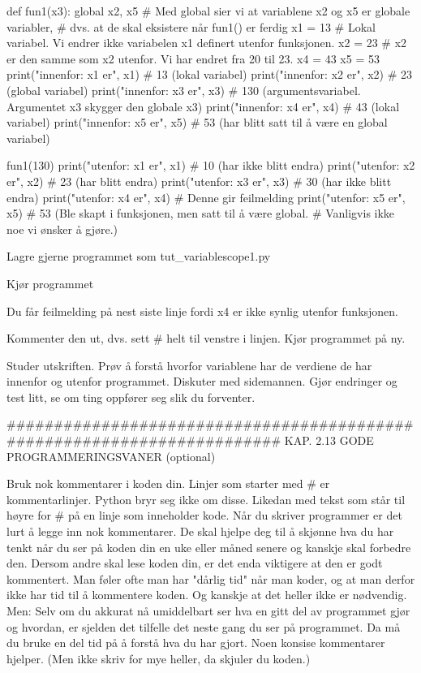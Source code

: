 {def fun1(x3):
    global x2, x5   # Med global sier vi at variablene x2 og x5 er globale variabler,  
                    # dvs. at de skal eksistere når fun1() er ferdig
    x1 = 13   # Lokal variabel. Vi endrer ikke variabelen x1 definert utenfor funksjonen. 
    x2 = 23   # x2 er den samme som x2 utenfor. Vi har endret fra 20 til 23. 
    x4 = 43
    x5 = 53
    print("innenfor: x1 er", x1)  #  13 (lokal variabel)
    print("innenfor: x2 er", x2)  #  23 (global variabel)
    print("innenfor: x3 er", x3)  # 130 (argumentsvariabel. Argumentet x3 skygger den globale x3)
    print("innenfor: x4 er", x4)  #  43 (lokal variabel)
    print("innenfor: x5 er", x5)  #  53 (har blitt satt til å være en global variabel)

fun1(130)
print("utenfor: x1 er", x1)   # 10 (har ikke blitt endra)
print("utenfor: x2 er", x2)   # 23 (har blitt endra)
print("utenfor: x3 er", x3)   # 30 (har ikke blitt endra)
print("utenfor: x4 er", x4)   # Denne gir feilmelding 
print("utenfor: x5 er", x5)   # 53 (Ble skapt i funksjonen, men satt til å være global. 
                              # Vanligvis ikke noe vi ønsker å gjøre.) 

Lagre gjerne programmet som tut_variablescope1.py

Kjør programmet

Du får feilmelding på nest siste linje fordi x4 er ikke synlig utenfor funksjonen. 

Kommenter den ut, dvs. sett # helt til venstre i linjen. 
Kjør programmet på ny.

Studer utskriften.
Prøv å forstå hvorfor variablene har de verdiene de har innenfor og utenfor programmet.
Diskuter med sidemannen. 
Gjør endringer og test litt, se om ting oppfører seg slik du forventer. 

######################################################################## 
KAP. 2.13  GODE PROGRAMMERINGSVANER  (optional)

Bruk nok kommentarer i koden din. 
Linjer som starter med # er kommentarlinjer. 
Python bryr seg ikke om disse. 
Likedan med tekst som står til høyre for # på en linje som inneholder kode.
Når du skriver programmer er det lurt å legge inn nok kommentarer.
De skal hjelpe deg til å skjønne hva du har tenkt når du ser på koden din
en uke eller måned senere og kanskje skal forbedre den.
Dersom andre skal lese koden din, er det enda viktigere at den er godt kommentert.
Man føler ofte man har "dårlig tid" når man koder,
og at man derfor ikke har tid til å kommentere koden.
Og kanskje at det heller ikke er nødvendig. 
Men: Selv om du akkurat nå umiddelbart ser hva en gitt del av programmet gjør og hvordan,
er sjelden det tilfelle det neste gang du ser på programmet.
Da må du bruke en del tid på å forstå hva du har gjort.
Noen konsise kommentarer hjelper.
(Men ikke skriv for mye heller, da skjuler du koden.) 

}
